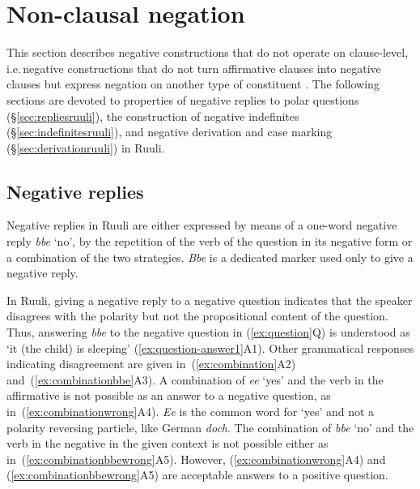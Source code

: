 \documentclass[output=paper,colorlinks,citecolor=brown,draftmode]{langscibook}
\begin{document}
\section{Non-clausal negation}
\label{sec:non-clausalruuli}

This section describes negative constructions that do not operate on clause-level, i.e.\,negative constructions that do not turn affirmative clauses into negative claus\-es but express negation on another type of constituent \citep[424]{Miestamo2017}.
The following sections are devoted to properties of negative replies to polar questions (§\ref{sec:repliesruuli}), the construction of negative indefinites (§\ref{sec:indefinitesruuli}), and negative derivation and case marking (§\ref{sec:derivationruuli}) in Ruuli.

\subsection{Negative replies}\label{sec:ruulietal:3.1}
\label{sec:repliesruuli}
Negative replies in Ruuli are either expressed by means of a one-word negative reply \textit{bbe} `no', by the repetition of the verb of the question in its negative form or a combination of the two strategies. \textit{Bbe} is a dedicated marker used only to give a negative reply.

In Ruuli, giving a negative reply to a negative question indicates that the speaker disagrees with the polarity but not the propositional content of the question. 
Thus, answering \textit{bbe} to the negative question in (\ref{ex:question}Q) is understood as `it (the child) is sleeping' (\ref{ex:question-answer1}A1).
Other grammatical responses indicating disagreement are given in~(\ref{ex:combination}A2) and~(\ref{ex:combinationbbe}A3). 
A combination of \textit{ee} `yes' and the verb in the affirmative is not possible as an answer to a negative question, as in~(\ref{ex:combinationwrong}A4). 
\textit{Ee} is the common word for `yes' and not a polarity reversing particle, like German \textit{doch}. 
The combination of \textit{bbe} `no' and the verb in the negative in the given context is not possible either as in~(\ref{ex:combinationbbewrong}A5). 
However, (\ref{ex:combinationwrong}A4) and (\ref{ex:combinationbbewrong}A5) are acceptable answers to a positive question.
\end{document}
